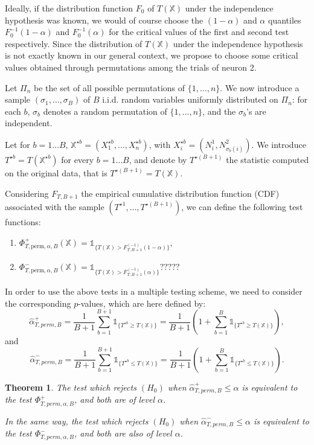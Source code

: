 \documentclass[a4paper,oneside,10pt]{article}
\newtheorem{thm}{Theorem}[subsection]
\newcommand{\pa}[1]{\ensuremath{\left( #1 \right)}}
\newcommand{\X}{\ensuremath{\mathds{X}}}
\newcommand{\1}[1]{\ensuremath{\mathds{1}_{\{ #1 \}}}}  %
\begin{document}
Ideally, if the distribution function $F_0$ of $T( \X)$ under the independence hypothesis was known, we would of course choose  the $(1-\alpha)$ and $\alpha$ quantiles $F_0^{-1}(1-\alpha)$ and $F_0^{-1}(\alpha)$ for the critical values of the first and second test respectively.
Since the distribution of $T(\X)$ under the independence hypothesis is not exactly known in our general context, we propose to choose some critical values obtained through  permutations among the trials of neuron 2.

Let $\Pi_n$ be the set of all possible permutations of $\{1,\ldots,n\}$.
We now introduce  a sample  $\pa{\sigma_1,\ldots,\sigma_B}$ of $B$  i.i.d. random variables uniformly distributed on $\Pi_n$: 
for each $b$, $\sigma_b$ denotes a random permutation of  $\{1,\ldots,n\}$, and the $\sigma_b$'s are independent. 

Let for $b=1\ldots B$, $\X^{\star b}=(X_1^{\star b},\ldots,X_n^{\star b})$, with $X_i^{\star b}=(N_i^1,N_{\sigma_b(i)}^2)$. We introduce $T^{\star b}=T(\X^{\star b})$ for every $b=1\ldots B$, and denote by $T^{\star (B+1)}$ the statistic computed on the original data, that is $T^{\star (B+1)}=T(\X)$.

Considering $F_{T,B+1}$ the empirical cumulative distribution function (CDF) associated with the sample $\pa{T^{\star 1},\ldots,T^{\star (B+1)}}$, we can define the following test functions:

\begin{enumerate}
\item $\Phi_{T,\textrm{perm},\alpha,B}^{+}(\X)=\1{T(\X)>F_{T,B+1}^{(-1)}(1-\alpha)},$
\item $\Phi_{T,\textrm{perm},\alpha,B}^{-}(\X)=\1{T(\X)>F_{T,B+1}^{(-1)}(\alpha)} ?????$
\end{enumerate}

In order to use the above tests in a multiple testing scheme, we need to consider the corresponding $p$-values, which are here defined by:
$$\hat{\alpha}^+_{T,perm,B}=\frac{1}{B+1}\sum_{b=1}^{B+1} \1{T^{\star b} \geq T(\X)}=\frac{1}{B+1}\pa{1+\sum_{b=1}^B \1{T^{\star b}\geq T(\X)}},$$
and 
$$\hat{\alpha}^-_{T,perm,B}=\frac{1}{B+1}\sum_{b=1}^{B+1} \1{T^{\star b}\leq T(\X)}=\frac{1}{B+1}\pa{1+\sum_{b=1}^B \1{T^{\star b}\leq T(\X)}}.$$

\begin{thm}
The test which rejects $(H_0)$ when $\hat{\alpha}^+_{T,perm,B}\leq \alpha$ is equivalent to the test $\Phi_{T,perm,\alpha,B}^+$, and both are of level $\alpha$.

In the same way, the test which rejects $(H_0)$ when $\hat{\alpha}^-_{T,perm,B}\leq \alpha$ is equivalent to the test $ \Phi_{T,perm,\alpha,B}^-$, and both are also of level $\alpha$.
\end{thm}
\end{document}
